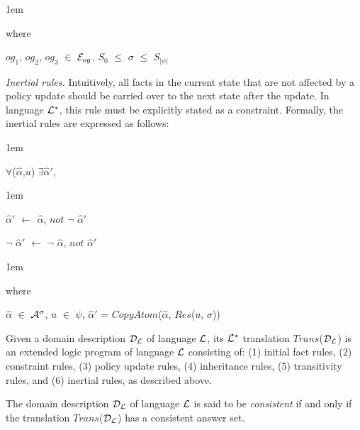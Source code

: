 \documentclass[global,twocolumn,final]{svjour}
\newenvironment{vdefinition}
  {\begin{definition}\hspace{0.25em}}
  {\end{definition}}
\newenvironment{vquote}
  {\begin{list}{}{\leftmargin 1em}\item[]}
  {\end{list}}
\begin{document}
\begin{itemize}
\begin{enumerate}
                  \begin{vquote}
                    where

                    $og_{1}$, $og_{2}$, $og_{3}$ $\in$ ${\cal E}_{og}$,
                    $S_{0}$ $\leq$ $\sigma$ $\leq$ $S_{|\psi|}$
                  \end{vquote}
               \end{enumerate}

            \item
              {\em Inertial rules.}
              Intuitively, all facts in the current state that are not affected
              by a policy update should be carried over to the next state after
              the update. In language ${\cal L}^{*}$, this rule must be
              explicitly stated as a constraint. Formally, the inertial rules
              are expressed as follows:

              \begin{vquote}
                $\forall$($\hat{\alpha}$,$u$) $\exists$$\hat{\alpha}'$,
              \end{vquote}

              \begin{vquote}
                $\hat{\alpha}'$ $\leftarrow$ $\hat{\alpha}$, $not$ $\lnot$ $\hat{\alpha}'$

                $\lnot$ $\hat{\alpha}'$ $\leftarrow$ $\lnot$ $\hat{\alpha}$, $not$ $\hat{\alpha}'$
              \end{vquote}

              \begin{vquote}
                where

                $\hat{\alpha}$ $\in$ ${\cal A}^{\sigma}$,
                $u$ $\in$ $\psi$,
                $\hat{\alpha}'$ = $CopyAtom$($\hat{\alpha}$, $Res$($u$, $\sigma$))
              \end{vquote}
          \end{itemize}

        \begin{vdefinition}
          \label{def-trans}
          Given a domain description ${\cal D_{L}}$ of language ${\cal L}$, its
          ${\cal L^{*}}$ translation $Trans$(${\cal D_{L}}$) is an extended
          logic program of language ${\cal L}$ consisting of: (1) initial fact
          rules, (2) constraint rules, (3) policy update rules, (4) inheritance
          rules, (5) transitivity rules, and (6) inertial rules, as described
          above.

          The domain description ${\cal D_{L}}$ of language ${\cal L}$ is said
          to be {\em consistent} if and only if the translation
          $Trans$(${\cal D_{L}}$) has a consistent answer set.
        \end{vdefinition}
\end{document}
